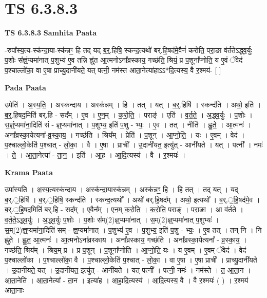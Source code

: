 \documentclass[17pt]{extarticle}
\begin{document}
\section{ TS 6.3.8.3 }

\textbf{TS 6.3.8.3 } \newline
\textbf{Samhita Paata} \newline

-रुपा᳚स्य॒त्य-स्क॑न्दा॒या-स्क॑न्नꣳ॒॒ हि तद् यद् ब॒र्॒.हिषि॒ स्कन्द॒त्यथो॑ बर्.हि॒षद॑मे॒वैनं॑ करोति॒ परा॒ङा व॑र्ततेऽद्ध्व॒र्युः प॒शोः स᳚ज्ञ्ं॒प्यमा॑नात् प॒शुभ्य॑ ए॒व तन्नि ह्नु॑त आ॒त्मनोऽना᳚व्रस्काय॒ गच्छ॑ति॒ श्रियं॒ प्र प॒शूना᳚प्नोति॒ य ए॒वं ॅवेद॑ प॒श्चाल्लो॑का॒ वा ए॒षा प्राच्यु॒दानी॑यते॒ यत् पत्नी॒ नम॑स्त आता॒नेत्या॑हाऽऽ*दि॒त्यस्य॒ वै र॒श्मय॑- [  ] \newline

\textbf{Pada Paata} \newline

उपेति॑ । अ॒स्य॒ति॒ । अस्क॑न्दाय । अस्क॑न्नम् । हि । तत् । यत् । ब॒र्॒.हिषि॑ । स्कन्द॑ति । अथो॒ इति॑ । ब॒र्॒.हि॒षद॒मिति॑ बर्.हि - सद᳚म् । ए॒व । ए॒न॒म् । क॒रो॒ति॒ । पराङ्॑ । एति॑ । व॒र्त॒ते॒ । अ॒द्ध्व॒र्युः । प॒शोः । स॒ज्ञ्ं॒प्यमा॑ना॒दिति॑ सं - ज्ञ्॒प्यमा॑नात् । प॒शुभ्य॒ इति॑ प॒शु - भ्यः॒ । ए॒व । तत् । नीति॑ । ह्नु॒ते॒ । आ॒त्मनः॑ । अना᳚व्रस्का॒येत्यना᳚-व्र॒स्का॒य॒ । गच्छ॑ति । श्रिय᳚म् । प्रेति॑ । प॒शून् । आ॒प्नो॒ति॒ । यः । ए॒वम् । वेद॑ । प॒श्चाल्लो॒केति॑ प॒श्चात् - लो॒का॒ । वै । ए॒षा । प्राची᳚ । उ॒दानी॑यत॒ इत्यु॑त् - आनी॑यते । यत् । पत्नी᳚ । नमः॑ । ते॒ । आ॒ता॒नेत्या᳚ - ता॒न॒ । इति॑ । आ॒ह॒ । आ॒दि॒त्यस्य॑ । वै । र॒श्मयः॑ ।  \newline


\textbf{Krama Paata} \newline

उपा᳚स्यति । अ॒स्य॒त्यस्क॑न्दाय । अस्क॑न्दा॒यास्क॑न्नम् । अस्क॑न्नꣳ॒॒ हि । हि तत् । तद् यत् । यद् ब॒र्.॒हिषि॑ । ब॒र्.॒हिषि॒ स्कन्द॑ति । स्कन्द॒त्यथो᳚ । अथो॑ बर्.हि॒षद᳚म् । अथो॒ इत्यथो᳚ । ब॒र्.॒हि॒षद॑मे॒व । ब॒र्.॒हि॒षद॒मिति॑ बर्.हि - सद᳚म् । ए॒वैन᳚म् । ए॒न॒म् क॒रो॒ति॒ । क॒रो॒ति॒ पराङ्॑ । परा॒ङा । आ व॑र्तते । व॒र्त॒ते॒ऽद्ध्व॒र्युः । अ॒द्ध्व॒र्युः प॒शोः । प॒शोः स᳚म्(2)ज्ञ्॒प्यमा॑नात् । स॒म्(2)ज्ञ्॒प्यमा॑नात् प॒शुभ्यः॑ । स॒म्(2)ज्ञ्॒प्यमा॑ना॒दिति॑ सम् - ज्ञ्॒प्यमा॑नात् । प॒शुभ्य॑ ए॒व । प॒शुभ्य॒ इति॑ प॒शु - भ्यः॒ । ए॒व तत् । तन् नि । नि ह्नु॑ते । ह्नु॒त॒ आ॒त्मनः॑ । आ॒त्मनोऽना᳚व्रस्काय । अना᳚व्रस्काय॒ गच्छ॑ति । अना᳚व्रस्का॒येत्यना᳚ - व्र॒स्का॒य॒ । गच्छ॑ति॒ श्रिय᳚म् । श्रिय॒म् प्र । प्र प॒शून् । प॒शूना᳚प्नोति । आ॒प्नो॒ति॒ यः । य ए॒वम् । ए॒वम् ॅवेद॑ । वेद॑ प॒श्चाल्लो॑का । प॒श्चाल्लो॑का॒ वै । प॒श्चाल्लो॒केति॑ प॒श्चात् - लो॒का॒ । वा ए॒षा । ए॒षा प्राची᳚ । प्राच्यु॒दानी॑यते । उ॒दानी॑यते॒ यत् । उ॒दानी॑यत॒ इत्यु॑त् - आनी॑यते । यत् पत्नी᳚ । पत्नी॒ नमः॑ । नम॑स्ते । त॒ आ॒ता॒न । आ॒ता॒नेति॑ । आ॒ता॒नेत्या᳚ - ता॒न । इत्या॑ह । आ॒हा॒दि॒त्यस्य॑ । आ॒दि॒त्यस्य॒ वै । वै र॒श्मयः॑ ( ) । र॒श्मय॑ आता॒नाः \newline
\end{document}
